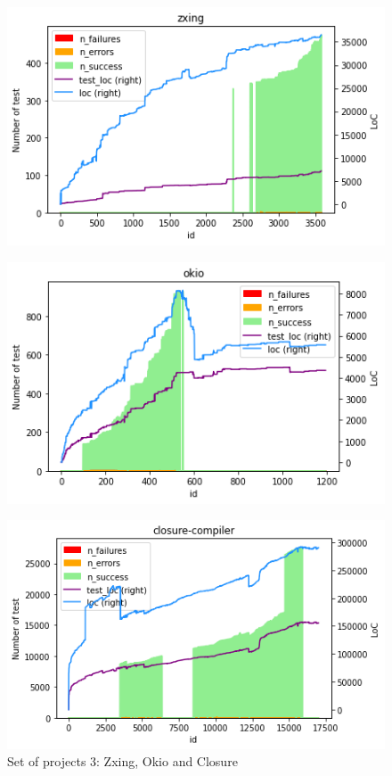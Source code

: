 \begin{figure}[!htb]
    \centering
    \caption{Set of projects 3: Zxing, Okio and Closure}
    \label{fig:projects-3}
    \begin{minipage}{.5\linewidth}
        \centering
        \includegraphics[width=\textwidth]{pages/02-Testability/images/projects/zxing.png}
        \label{fig:zxing}
    \end{minipage}%
    \begin{minipage}{.5\linewidth}
        \centering
        \includegraphics[width=\textwidth]{pages/02-Testability/images/projects/okio.png}
        \label{fig:okio}
    \end{minipage}
    \begin{minipage}{.5\linewidth}
        \centering
        \includegraphics[width=\textwidth]{pages/02-Testability/images/projects/closure.png}

\end{minipage}
\end{figure}
